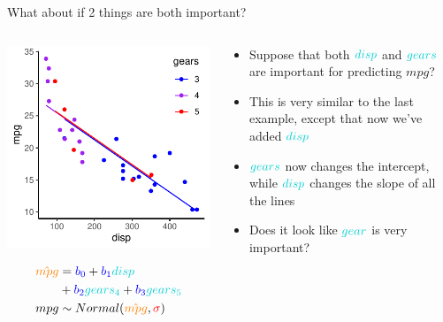 \documentclass[
  ignorenonframetext,
  aspectratio=169]{beamer}
\providecommand{\tightlist}{%
  \setlength{\itemsep}{0pt}\setlength{\parskip}{0pt}}
\begin{document}
\begin{frame}{What about if 2 things are both important?}
\protect\hypertarget{what-about-if-2-things-are-both-important}{}
\begin{columns}[T]
\begin{column}{0.48\textwidth}
\includegraphics{03-Lecture_files/figure-beamer/unnamed-chunk-12-1.pdf}

\begin{equation*} 
\begin{split}
\textcolor{orange}{\hat{mpg}} & = \textcolor{blue}{b_0} + \textcolor{blue}{b_1}\textcolor{darkturquoise}{disp} \\
&+ \textcolor{blue}{b_2}\textcolor{darkturquoise}{gears_4} + \textcolor{blue}{b_3}\textcolor{darkturquoise}{gears_5} \\
mpg & \sim Normal(\textcolor{orange}{\hat{mpg}},\textcolor{red}{\sigma})
\end{split}
\end{equation*}
\end{column}

\begin{column}{0.48\textwidth}
\begin{itemize}
\tightlist
\item
  Suppose that both \(\textcolor{darkturquoise}{disp}\) and
  \(\textcolor{darkturquoise}{gears}\) are important for predicting
  \(mpg\)?
\item
  This is very similar to the last example, except that now we've added
  \(\textcolor{darkturquoise}{disp}\)
\item
  \(\textcolor{darkturquoise}{gears}\) now changes the intercept, while
  \(\textcolor{darkturquoise}{disp}\) changes the slope of all the lines
\item
  Does it look like \(\textcolor{darkturquoise}{gear}\) is very
  important?
\end{itemize}
\end{column}
\end{columns}
\end{frame}
\end{document}
